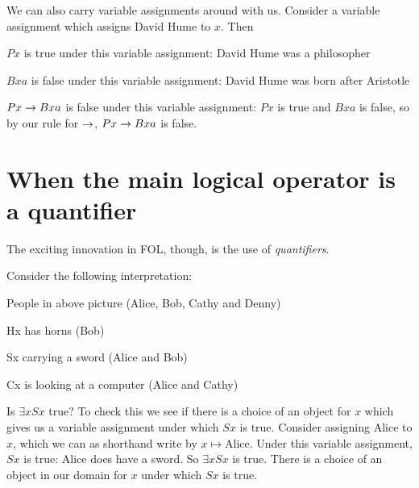 We can also carry variable assignments around with us. Consider a variable assignment which assigns David Hume to $x$. Then \begin{ebullet}
\item $Px$ is true under this variable assignment: David Hume was a philosopher
\item $Bxa$ is false under this variable assignment: David Hume was born after Aristotle
\item $Px\rightarrow Bxa$ is false under this variable assignment: $Px$ is true and $Bxa$ is false, so by our rule for $\rightarrow$, $Px\rightarrow Bxa$ is false.
\end{ebullet}


\section{When the main logical operator is a quantifier}
The exciting innovation in FOL, though, is the use of \emph{quantifiers}.

Consider the following interpretation:
\begin{center}

\begin{ekey}\item[\text{domain}] People in above picture (Alice, Bob, Cathy and Denny)
\item[Hx]  has horns (Bob)
\item[Sx]  carrying a sword (Alice and Bob)
\item[Cx] is looking at a computer (Alice and Cathy)
\end{ekey}
\end{center}

Is $\exists x Sx$ true? To check this we see if there is a choice of an object for $x$ which gives us a variable assignment under which $Sx$ is true. Consider assigning Alice to $x$, which we can as shorthand write by $x\mapsto \text{Alice}$. Under this variable assignment, $Sx$ is true: Alice does have a sword. So $\exists x Sx$ is true. There is a choice of an object in our domain for $x$ under which $Sx$ is true.

